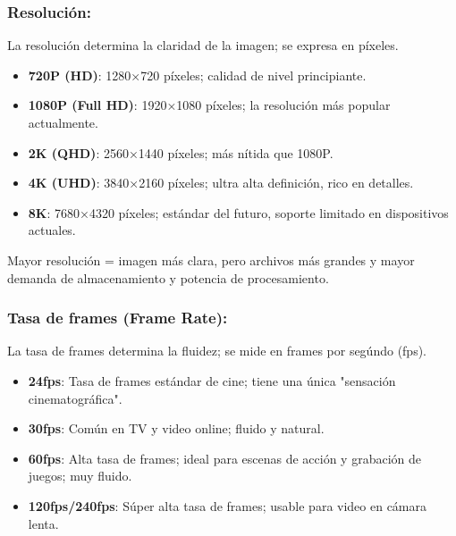 


\subsubsection*{Resolución:}

La resolución determina la claridad de la imagen; se expresa en píxeles.

\begin{itemize}
  \item \textbf{720P (HD)}: 1280×720 píxeles; calidad de nivel principiante.
  \item \textbf{1080P (Full HD)}: 1920×1080 píxeles; la resolución más popular actualmente.
  \item \textbf{2K (QHD)}: 2560×1440 píxeles; más nítida que 1080P.
  \item \textbf{4K (UHD)}: 3840×2160 píxeles; ultra alta definición, rico en detalles.
  \item \textbf{8K}: 7680×4320 píxeles; estándar del futuro, soporte limitado en dispositivos actuales.
\end{itemize}

Mayor resolución = imagen más clara, pero archivos más grandes y mayor demanda de almacenamiento y potencia de procesamiento.

\subsubsection*{Tasa de frames (Frame Rate):}

La tasa de frames determina la fluidez; se mide en frames por segúndo (fps).

\begin{itemize}
  \item \textbf{24fps}: Tasa de frames estándar de cine; tiene una única "sensación cinematográfica".
  \item \textbf{30fps}: Común en TV y video online; fluido y natural.
  \item \textbf{60fps}: Alta tasa de frames; ideal para escenas de acción y grabación de juegos; muy fluido.
  \item \textbf{120fps/240fps}: Súper alta tasa de frames; usable para video en cámara lenta.
\end{itemize}

